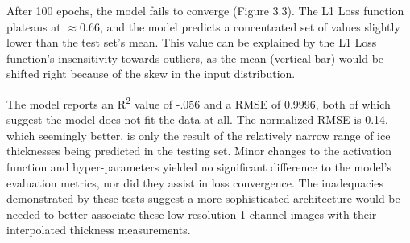 After 100 epochs, the model fails to converge (Figure 3.3). The L1 Loss function plateaus at $\approx0.66$, and the model predicts a concentrated set of values slightly lower than the test set's mean. This value can be explained by the L1 Loss function's insensitivity towards outliers, as the mean (vertical bar) would be shifted right because of the skew in the input distribution.

The model reports an R\textsuperscript{2} value of -.056 and a RMSE of 0.9996, both of which suggest the model does not fit the data at all. The normalized RMSE is 0.14, which seemingly better, is only the result of the relatively narrow range of ice thicknesses being predicted in the testing set. Minor changes to the activation function and hyper-parameters yielded no significant difference to the model's evaluation metrics, nor did they assist in loss convergence. The inadequacies demonstrated by these tests suggest a more sophisticated architecture would be needed to better associate these low-resolution 1 channel images with their interpolated thickness measurements.

